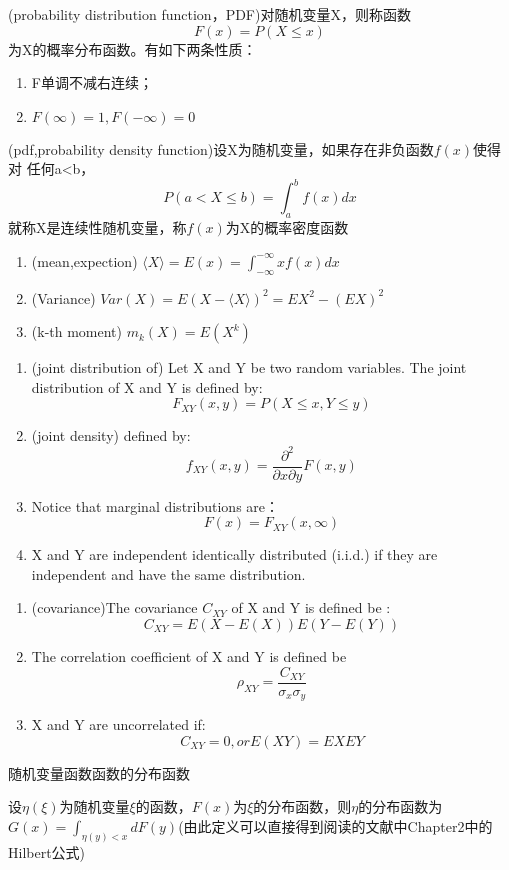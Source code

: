 \begin{define}
(probability distribution function，PDF)对随机变量X，则称函数
\[
F(x)=P(X\leqslant x)
\]
为X的概率分布函数。有如下两条性质：
\begin{enumerate}
\item F单调不减右连续；
\item $F(\infty)=1,F(-\infty)=0$
\end{enumerate}
\end{define}
\begin{define}
(pdf,probability density function)设X为随机变量，如果存在非负函数$f(x)$使得对
任何a<b，
\[P(a<X\leqslant b)=\int_{a}^{b}f(x)dx\]
就称X是连续性随机变量，称$f(x)$为X的概率密度函数
\end{define}
\begin{define}

\begin{enumerate}


\item (mean,expection) $\langle X \rangle=E(x)=\int_{-\infty}^{-\infty}xf(x)dx$
\item (Variance) $Var(X)=E(X-\langle X\rangle)^2=EX^2-(EX)^2$
\item (k-th moment) $m_k(X)=E(X^k)$
\end{enumerate}
\end{define}
\begin{define}
\begin{enumerate}
\item (joint distribution of) Let X and Y be two random variables. The joint distribution of
X and Y is defined by:
\[F_{XY}(x,y)=P(X\leqslant x,Y\leqslant y)\]
\item (joint density) defined by:
\[f_{XY}(x,y)=\dfrac{\partial^2}{\partial x\partial y}F(x,y)\]
\item Notice that marginal distributions are：
\[F(x)=F_{XY}(x,\infty)\]
\item X and Y are independent identically distributed (i.i.d.) if
they are independent and have the same distribution.
\end{enumerate}
\end{define}
\begin{define}
\begin{enumerate}
\item (covariance)The covariance $C_{XY}$ of X and Y is defined be :
\[C_{XY}=E(X-E(X))E(Y-E(Y)) \]
\item The correlation coefficient of X and Y is defined be
\[\rho_{XY}=\dfrac{C_{XY}}{\sigma_x\sigma_y}\]
\item 
X and Y are uncorrelated if:
\[C_{XY}=0,or E(XY)=EXEY\]

\end{enumerate}
\end{define}
\begin{define}
随机变量函数函数的分布函数

设$\eta (\xi)$为随机变量$\xi$的函数，$F(x)$为$\xi$的分布函数，则$
\eta$的分布函数为$G(x)=\int_{\eta(y)<x}dF(y)$(由此定义可以直接得到阅读的文献中Chapter2中的Hilbert公式)
\end{define}

